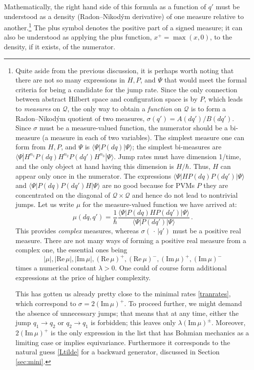 \documentclass[12pt]{article}
\newcommand{\1}{\mathbf{1}} %
\renewcommand{\Re}{\mathrm{Re}} %
\renewcommand{\Im}{\mathrm{Im}} %
\renewcommand{\sp}[2]{\langle #1 | #2 \rangle} %
\newcommand{\conf}{\mathcal{Q}} %
\newcommand{\pov}{{P}}%
\begin{document}
Mathematically, the right hand side of this formula as a function of
$q'$ must be understood as a density (Radon--Nikod{\'y}m derivative)
of one measure relative to another.\footnote{Quite aside from the
previous discussion, it is perhaps worth noting that there are not so
many expressions in $H,\pov$, and $\Psi$ that would meet the formal
criteria for being a candidate for the jump rate. Since the only
connection between abstract Hilbert space and configuration space is
by $\pov$, which leads to \emph{measures} on $\conf$, the only way to
obtain a \emph{function} on $\conf$ is to form a Radon--Nikod{\'y}m
quotient of two measures, $\sigma(q') = A(dq')/B(dq')$. Since $\sigma$
must be a measure-valued function, the numerator should be a
bi-measure (a measure in each of two variables). The simplest measure
one can form from $H,\pov$, and $\Psi$ is $\sp{\Psi}{\pov(dq)|\Psi}$;
the simplest bi-measures are $\sp{\Psi}{H^{n_1} \pov(dq) H^{n_2}
\pov(dq') H^{n_3}| \Psi}$. Jump rates must have dimension 1/time, and
the only object at hand having this dimension is $H/\hbar$. Thus, $H$
can appear only once in the numerator. The expressions $\sp{\Psi}{H
\pov(dq) \pov(dq')| \Psi}$ and $\sp{\Psi}{\pov(dq) \pov(dq') H| \Psi}$
are no good because for PVMs $\pov$ they are concentrated on the
diagonal of $\conf \times \conf$ and hence do not lead to nontrivial
jumps. Let us write $\mu$ for the measure-valued function we have
arrived at:
\[
   \mu (dq,q') = \frac{1}{\hbar} \frac{\sp{\Psi}{\pov(dq) H \pov(dq')
   | \Psi}} {\sp{\Psi}{\pov(dq')|\Psi}}\,.
\]
This provides \emph{complex} measures, whereas $\sigma(\,\cdot\,|q')$
must be a positive real measure. There are not many ways of forming
a positive real measure from a complex one, the essential ones being
\[
   |\mu|, |\Re \, \mu|, |\Im \, \mu|, (\Re \, \mu)^+, (\Re \, \mu)^-,
   (\Im \, \mu)^+, (\Im \, \mu)^-
\]
times a numerical constant $\lambda>0$. One could of course form
additional expressions at the price of higher complexity.

This has gotten us already pretty close to the minimal rates
\eqref{tranrates}, which correspond to $\sigma = 2(\Im \, \mu)^+$. To
proceed further, we might demand the absence of unnecessary jumps;
that means that at any time, either the jump $q_1 \to q_2$ or $q_2 \to
q_1$ is forbidden; this leaves only $\lambda (\Im \,
\mu)^\pm$. Moreover, $2 (\Im \, \mu)^+$ is the only expression in the
list that has Bohmian mechanics as a limiting case or implies
equivariance. Furthermore it corresponds to the natural guess
\eqref{Ltilde} for a backward generator, discussed in Section
\ref{sec:mini}.} The plus symbol denotes the positive part of a signed
measure; it can also be understood as applying the plus function, $x^+
= \max (x,0)$, to the density, if it exists, of the numerator.
\end{document}
